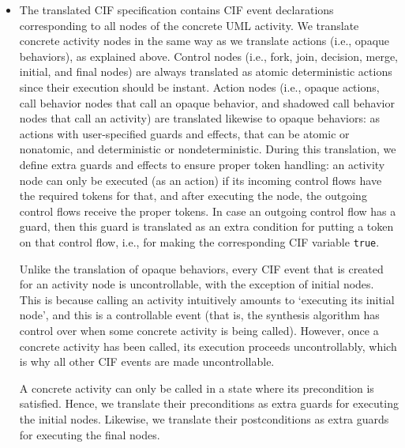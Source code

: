 \documentclass{article}
\theoremstyle{definition}
\begin{document}
\begin{itemize}
\begin{itemize}
		This variable then indicates whether the corresponding control flow contains a token (\texttt{true}) or not (\texttt{false}).
		\item The translated CIF specification contains CIF event declarations corresponding to all nodes of the concrete UML activity.
		We translate concrete activity nodes in the same way as we translate actions (i.e., opaque behaviors), as explained above.
		Control nodes (i.e., fork, join, decision, merge, initial, and final nodes) are always translated as atomic deterministic actions since their execution should be instant.
		Action nodes (i.e., opaque actions, call behavior nodes that call an opaque behavior, and shadowed call behavior nodes that call an activity) are translated likewise to opaque behaviors: as actions with user-specified guards and effects, that can be atomic or nonatomic, and deterministic or nondeterministic.
		During this translation, we define extra guards and effects to ensure proper token handling: an activity node can only be executed (as an action) if its incoming control flows have the required tokens for that, and after executing the node, the outgoing control flows receive the proper tokens.
		In case an outgoing control flow has a guard, then this guard is translated as an extra condition for putting a token on that control flow, i.e., for making the corresponding CIF variable \texttt{true}.

		Unlike the translation of opaque behaviors, every CIF event that is created for an activity node is uncontrollable, with the exception of initial nodes.
		This is because calling an activity intuitively amounts to `executing its initial node', and this is a controllable event (that is, the synthesis algorithm has control over when some concrete activity is being called).
		However, once a concrete activity has been called, its execution proceeds uncontrollably, which is why all other CIF events are made uncontrollable.

		A concrete activity can only be called in a state where its precondition is satisfied.
		Hence, we translate their preconditions as extra guards for executing the initial nodes.
		Likewise, we translate their postconditions as extra guards for executing the final nodes.
	\end{itemize}
	

\end{itemize}
\end{document}
